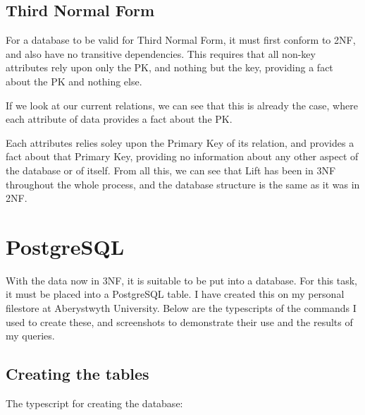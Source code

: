 \documentclass[11pt]{scrartcl} %
\begin{document}
\subsection{Third Normal Form}
For a database to be valid for Third Normal Form, it must first conform to 2NF, and also have no transitive dependencies. This requires that all non-key attributes rely upon only the PK, and nothing but the key, providing a fact about the PK and nothing else. 

If we look at our current relations, we can see that this is already the case, where each attribute of data provides a fact about the PK.

Each attributes relies soley upon the Primary Key of its relation, and provides a fact about that Primary Key, providing no information about any other aspect of the database or of itself. From all this, we can see that Lift has been in 3NF throughout the whole process, and the database structure is the same as it was in 2NF.

\newpage

\section{PostgreSQL}
With the data now in 3NF, it is suitable to be put into a database. For this task, it must be placed into a PostgreSQL table. I have created this on my personal filestore at Aberystwyth University. Below are the typescripts of the commands I used to create these, and screenshots to demonstrate their use and the results of my queries.

\subsection{Creating the tables}
The typescript for creating the database:


\end{document}
